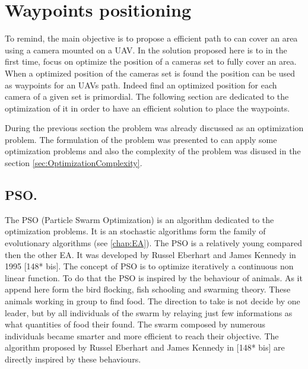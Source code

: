 \chapter{Waypoints positioning} 
\minitoc
To remind, the main objective is to propose a efficient path to can cover an area using a camera mounted on a UAV. In the solution proposed here is to in the first time, focus on optimize the position of a cameras set to fully cover an area. When a optimized position of the cameras set is found the position can be used as waypoints for an UAVs path. Indeed find an optimized position for each camera of a given set is primordial. The following section are dedicated to the optimization of it in order to have an efficient solution to place the waypoints.





During the previous section the problem was already discussed as an optimization problem. The formulation of the problem was presented to can apply some optimization problems and also the complexity of the problem was disused in the section \ref{sec:OptimizationComplexity}.



\section{PSO. }

The PSO (Particle Swarm Optimization) is an algorithm dedicated to the optimization problems. It is an stochastic algorithms form the family of evolutionary algorithms (see \ref{chap:EA}). 
The PSO is a relatively young compared then the other EA. It was developed by Russel Eberhart and James Kennedy in 1995 [148* bis]. The concept of PSO is to optimize iteratively a continuous non linear function. To do that the PSO is inspired by the behaviour of animals. As it append here form the bird flocking, fish schooling and swarming theory. These animals working in group to find food. 
The direction to take is not decide by one leader, but by all individuals of the swarm by relaying just few informations as what quantities of food their found. 
The swarm composed by numerous individuals became smarter and more efficient to reach their objective. 
The algorithm proposed by Russel Eberhart and James Kennedy in [148* bis] are directly inspired by these behaviours.

